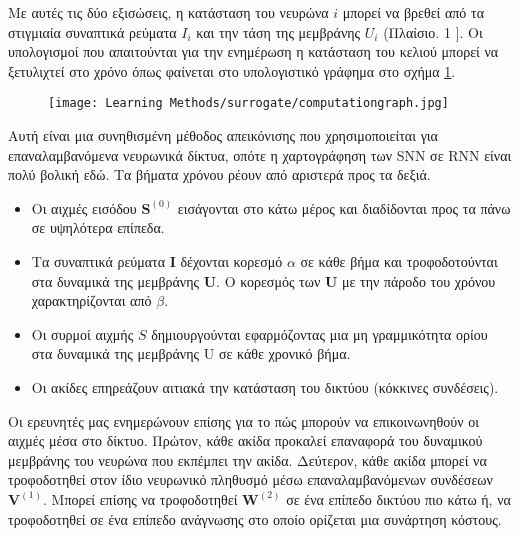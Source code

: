 \documentclass[12pt]{report}
\begin{document}
Με αυτές τις δύο εξισώσεις, η κατάσταση του νευρώνα $i$ μπορεί να βρεθεί από τα στιγμιαία συναπτικά ρεύματα $I_{i}$ και την τάση της μεμβράνης $U_{i}$ (Πλαίσιο. 1 $]. $ Οι υπολογισμοί που απαιτούνται για την ενημέρωση η κατάσταση του κελιού μπορεί να ξετυλιχτεί στο χρόνο όπως φαίνεται στο υπολογιστικό γράφημα στο σχήμα \ref{fig:computationgraph}.
\begin{figure}[htp]
    \centering
    \texttt{[image: Learning Methods/surrogate/computationgraph.jpg]}
    \caption{}
    \label{fig:computationgraph}
\end{figure}
Αυτή είναι μια συνηθισμένη μέθοδος απεικόνισης που χρησιμοποιείται για επαναλαμβανόμενα νευρωνικά δίκτυα, οπότε η χαρτογράφηση των \textlatin{SNN} σε \textlatin{RNN} είναι πολύ βολική εδώ. Τα βήματα χρόνου ρέουν από αριστερά προς τα δεξιά.
\begin{itemize}
    \item  Οι αιχμές εισόδου $\mathbf{S}^{(0)}$ εισάγονται στο κάτω μέρος και διαδίδονται προς τα πάνω σε υψηλότερα επίπεδα.
    \item  Τα συναπτικά ρεύματα $\mathbf{I}$ δέχονται κορεσμό $\alpha$ σε κάθε βήμα και τροφοδοτούνται στα δυναμικά της μεμβράνης  $\mathbf{U}$. Ο κορεσμός των $\mathbf{U}$ με την πάροδο του χρόνου χαρακτηρίζονται από $\beta .$
    \item Οι συρμοί αιχμής $S$ δημιουργούνται εφαρμόζοντας μια μη γραμμικότητα ορίου στα δυναμικά της μεμβράνης $\mathrm{U}$ σε κάθε χρονικό βήμα.
    \item  Οι ακίδες επηρεάζουν αιτιακά την κατάσταση του δικτύου (κόκκινες συνδέσεις).
    
\end{itemize}
Οι ερευνητές μας ενημερώνουν επίσης για το πώς μπορούν να επικοινωνηθούν οι αιχμές μέσα στο δίκτυο.
Πρώτον, κάθε ακίδα προκαλεί επαναφορά του δυναμικού μεμβράνης του νευρώνα που εκπέμπει την ακίδα. Δεύτερον, κάθε ακίδα μπορεί να τροφοδοτηθεί στον ίδιο νευρωνικό πληθυσμό μέσω επαναλαμβανόμενων συνδέσεων $\mathbf{V}^{(1)}$. Μπορεί επίσης να τροφοδοτηθεί $\mathbf{W}^{(2)}$ σε ένα επίπεδο δικτύου πιο κάτω ή, να τροφοδοτηθεί σε ένα επίπεδο ανάγνωσης στο οποίο ορίζεται μια συνάρτηση κόστους.
\end{document}
